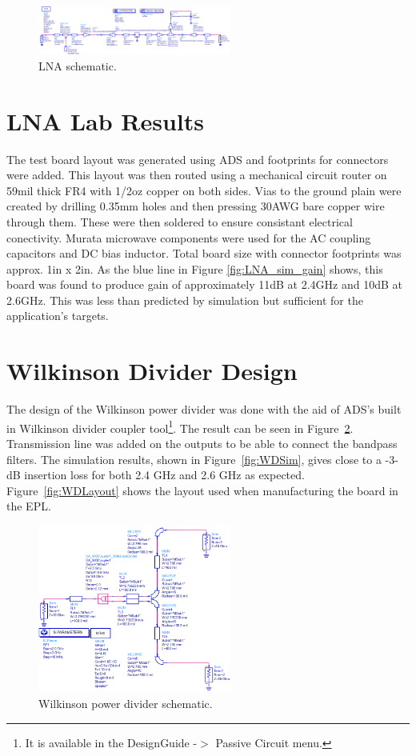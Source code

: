 \documentclass[conference]{IEEEtran}
\begin{document}
\begin{figure}[!h]
\centering
\includegraphics[width=2.5in]{amplifier_simulation_pics/lnaSchematic.PNG}
\caption{LNA schematic.}
\label{fig:LNA_lna_schematic}
\end{figure}

\section{LNA Lab Results}
The test board layout was generated using ADS and footprints for connectors were added. This layout was then routed using a mechanical circuit router on 59mil thick FR4 with 1/2oz copper on both sides. Vias to the ground plain were created by drilling 0.35mm holes and then pressing 30AWG bare copper wire through them. These were then soldered to ensure consistant electrical conectivity. Murata microwave components were used for the AC coupling capacitors and DC bias inductor. Total board size with connector footprints was approx. 1in x 2in. As the blue line in Figure \ref{fig:LNA_sim_gain} shows, this board was  found to produce gain of approximately 11dB at 2.4GHz and 10dB at 2.6GHz. This was less than predicted by simulation but sufficient for the application's targets.


\section{Wilkinson Divider Design}
The design of the Wilkinson power divider was done with the aid of ADS's built in Wilkinson divider coupler tool\footnote{It is available in the DesignGuide -$>$ Passive Circuit menu.}.  The result can be seen in Figure~\ref{fig:WDSchematic}.  Transmission line was added on the outputs to be able to connect the bandpass filters.  The simulation results, shown in Figure~\ref{fig:WDSim}, gives close to a -3-dB insertion loss for both 2.4 GHz and 2.6 GHz as expected.  Figure~\ref{fig:WDLayout} shows the layout used when manufacturing the board in the EPL.

\begin{figure}[!htb]
\centering
\includegraphics[width=2.5in]{wilkinson-pics/wilkinson-schematic.png}
\caption{Wilkinson power divider schematic.}
\label{fig:WDSchematic}
\end{figure}
\end{document}
